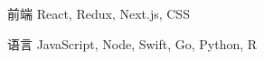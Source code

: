 

\begin{cvskills}


  \cvskill
    {前端} %
    {React, Redux, Next.js, CSS} %

  \cvskill
    {语言} %
    {JavaScript, Node, Swift, Go, Python, R} %

\end{cvskills}
